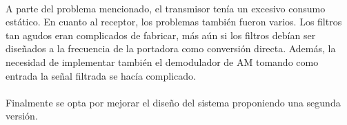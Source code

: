\paragraph{}
A parte del problema mencionado, el transmisor tenía un excesivo consumo estático. En cuanto al receptor, los problemas también fueron varios. Los filtros tan agudos eran complicados de fabricar, más a\'un si los filtros debían ser diseñados a la frecuencia de la portadora como conversión directa. Además, la necesidad de implementar también el demodulador de AM tomando como entrada la señal filtrada se hacía complicado.
\paragraph{}
Finalmente se opta por mejorar el diseño del sistema proponiendo una segunda versión.
